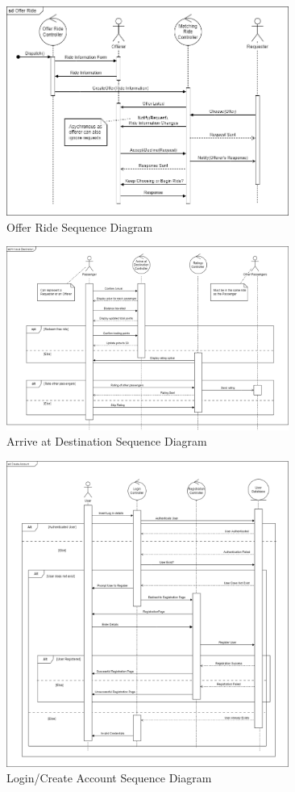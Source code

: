 \documentclass[]{article}
\begin{document}
\begin{figure}[h]
	\centering
	\includegraphics[width=25em]{assets/D3_13.PNG}
	\caption{Offer Ride Sequence Diagram}
	\label{fig:acd}
\end{figure}

\pagebreak
\begin{figure}[h]
	\centering
	\includegraphics[width=25em]{assets/D3_16.PNG}
	\caption{Arrive at Destination Sequence Diagram}
	\label{fig:acd}
\end{figure}

\begin{figure}[h]
	\centering
	\includegraphics[width=25em]{assets/D3_15.PNG}
	\caption{Login/Create Account Sequence Diagram}
	\label{fig:acd}
\end{figure}
\end{document}
